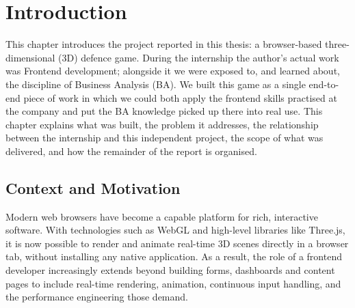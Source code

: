 
\chapter{Introduction}

This chapter introduces the project reported in this thesis: a browser-based
three-dimensional (3D) defence game. During the internship the author's actual
work was Frontend development; alongside it we were exposed to, and learned
about, the discipline of Business Analysis (BA). We built this game as a single
end-to-end piece of work in which we could both apply the frontend skills
practised at the company and put the BA knowledge picked up there into real use.
This chapter explains what was built, the problem it addresses, the relationship
between the internship and this independent project, the scope of what was
delivered, and how the remainder of the report is organised.

\section{Context and Motivation}

Modern web browsers have become a capable platform for rich, interactive
software. With technologies such as WebGL and high-level libraries like
Three.js, it is now possible to render and animate real-time 3D scenes directly
in a browser tab, without installing any native application. As a result, the
role of a frontend developer increasingly extends beyond building forms,
dashboards and content pages to include real-time rendering, animation,
continuous input handling, and the performance engineering those demand.

